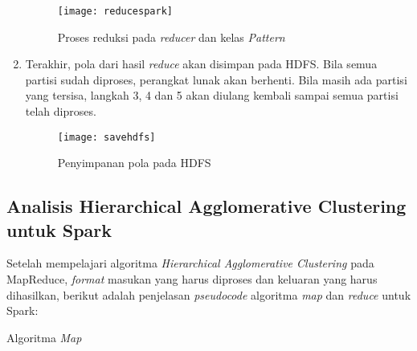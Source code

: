 \begin{enumerate}
\begin{figure}[H]
    \centering  
    \texttt{[image: reducespark]}  
    \caption[Proses reduksi pada \textit{reducer} dan kelas \textit{Pattern}]{Proses reduksi pada \textit{reducer} dan kelas \textit{Pattern}} 
    \label{fig:reducespark} 
\end{figure}


\item Terakhir, pola dari hasil \textit{reduce} akan disimpan pada HDFS. Bila semua partisi sudah diproses, perangkat lunak akan berhenti. Bila masih ada partisi yang tersisa, langkah 3, 4 dan 5 akan diulang kembali sampai semua partisi telah diproses.

\begin{figure}[H]
    \centering  
    \texttt{[image: savehdfs]}  
    \caption[Penyimpanan pola pada HDFS]{Penyimpanan pola pada HDFS} 
    \label{fig:savehdfs} 
\end{figure}

\end{enumerate}

\subsection{Analisis Hierarchical Agglomerative Clustering untuk Spark}

Setelah mempelajari algoritma \textit{Hierarchical Agglomerative Clustering} pada MapReduce, \textit{format} masukan yang harus diproses dan keluaran yang harus dihasilkan, berikut adalah penjelasan \textit{pseudocode} algoritma \textit{map} dan \textit{reduce} untuk Spark:\\

\begin{algorithm}[H]
	\label{alg:map}
	\DontPrintSemicolon\SetAlgoNoLine\LinesNumbered
	\BlankLine
	
	\caption{Algoritma \textit{Map}}
	
\end{algorithm}

